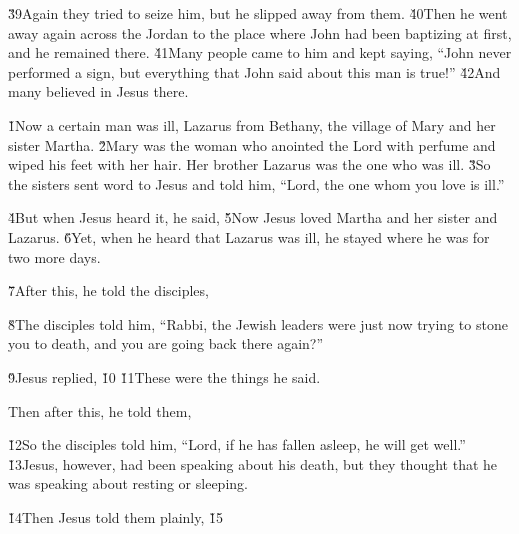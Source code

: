 \v{39}Again they tried to seize him, but he slipped away from them. \v{40}Then he went away again across the Jordan to the place where John had been baptizing at first, and he remained there. \v{41}Many people came to him and kept saying, ``John never performed a sign, but everything that John said about this man is true!'' \v{42}And many believed in Jesus there.

\v{1}Now a certain man was ill, Lazarus from Bethany, the village of Mary and her sister Martha. \v{2}Mary was the woman who anointed the Lord with perfume and wiped his feet with her hair. Her brother Lazarus was the one who was ill. \v{3}So the sisters sent word to Jesus and told him, ``Lord, the one whom you love is ill.''

\v{4}But when Jesus heard it, he said,  \v{5}Now Jesus loved Martha and her sister and Lazarus. \v{6}Yet, when he heard that Lazarus was ill, he stayed where he was for two more days.

\v{7}After this, he told the disciples, 

\v{8}The disciples told him, ``Rabbi, the Jewish leaders were just now trying to stone you to death, and you are going back there again?''

\v{9}Jesus replied,  \v{10} \v{11}These were the things he said.

Then after this, he told them, 

\v{12}So the disciples told him, ``Lord, if he has fallen asleep, he will get well.'' \v{13}Jesus, however, had been speaking about his death, but they thought that he was speaking about resting or sleeping.

\v{14}Then Jesus told them plainly,  \v{15}

